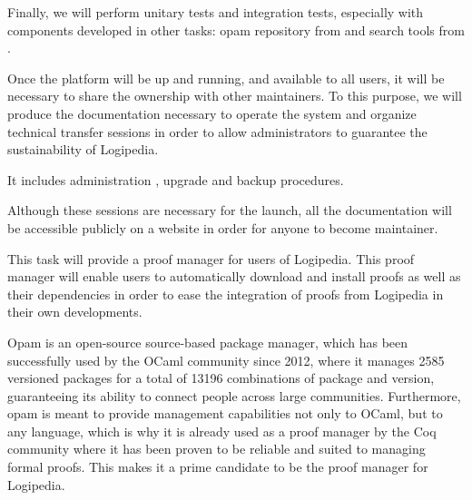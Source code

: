 \begin{workpackage}[id=access,type=RTD,
  short=Access,%
  title={Access},
  lead=Irt,IrtRM=23,OcaRM=6,EduRM=12,InrRM=18]
\begin{tasklist}
\begin{task}[id=web,
      title=Giving access to the infrastructure on the world-wide web,
      lead=Irt,IrtRM=18]
    Finally, we will perform unitary tests and integration tests,
    especially with components developed in other tasks: opam
    repository from  and search tools from
    .
  \end{task}

  \begin{task}[id=transfer,
      title=Transfer for the sustainability of the system,
      lead=Irt,IrtRM=1]
    Once the platform will be up and running, and available to all
    users, it will be necessary to share the ownership with other
    maintainers. To this purpose, we will produce the documentation
    necessary to operate the system and organize technical transfer
    sessions in order to allow administrators to guarantee the
    sustainability of Logipedia.

    It includes administration , upgrade and backup procedures.

    Although these sessions are necessary for the launch, all the
    documentation will be accessible publicly on a website in order
    for anyone to become maintainer.
  \end{task}

  \begin{task}[id=opam,
      title=Giving access to the infrastructure in proof tools,
      lead=Oca,
      OcaRM=6]
    This task will provide a proof manager for users of Logipedia. This proof
    manager will enable users to automatically download and install
    proofs as well as their dependencies in order to ease the
    integration of proofs from Logipedia in their own developments.

    Opam \cite{OPAM} is an open-source source-based package manager,
    which has been successfully used by the OCaml community since
    2012, where it manages 2585 versioned packages for a total of
    13196 combinations of package and version, guaranteeing its
    ability to connect people across large communities. Furthermore,
    opam is meant to provide management capabilities not only to
    OCaml, but to any language, which is why it is already used as a
    proof manager by the Coq community where it has been proven to be
    reliable and suited to managing formal proofs. This makes it a
    prime candidate to be the proof manager for Logipedia.


\end{task}
\end{tasklist}
\end{workpackage}
